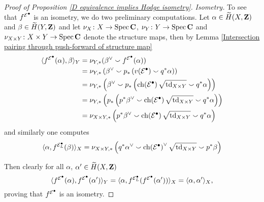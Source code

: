 \begin{proof}[Proof of Proposition \ref{D equivalence implies Hodge isometry}]
    \vspace{0.5cm}
    \noindent
    \textsl{Isometry.}
    To see that $f^{\mathcal E^\bullet}$ is an isometry, we do two preliminary computations. Let $\alpha \in \widetilde{H}(X, \mathbf Z)$ and $\beta \in \widetilde{H}(Y, \mathbf Z)$ and let $\nu_X \colon X \to \operatorname{Spec}\mathbf C$, $\nu_Y \colon Y \to \operatorname{Spec}\mathbf C$ and $\nu_{X \times Y} \colon X \times Y \to \operatorname{Spec}\mathbf C$ denote the structure maps, then by Lemma \ref{Intersection pairing through push-forward of structure map}
    \begin{align*}
        \pairing{\fmcoh{\E^\bullet}(\alpha)}{\beta}_Y &= \nu_{Y, *}(\beta^\vee \smallsmile \fmcoh{\E^\bullet}(\alpha))
        \\
        &= \nu_{Y, *}\left(
            \beta^\vee \smallsmile p_*\left(v(\E^\bullet) \smallsmile q^*\alpha\right)\right) 
        \\
        &= \nu_{Y, *}\left(
            \beta^\vee \smallsmile p_*\left(\ch{\E^\bullet}
            {\sqrt{\tdclass{X \times Y}}}
            \smallsmile q^*\alpha\right)
        \right) 
        \\
        &= \nu_{Y, *}\left( 
            p_*\left(
                p^*\beta^\vee \smallsmile \ch{\E^\bullet}
                {\sqrt{\tdclass{X \times Y}}}
                \smallsmile q^*\alpha
            \right)
        \right) \\
        &= \nu_{X \times Y, *}\left(
            p^*\beta^\vee \smallsmile \ch{\E^\bullet}
                {\sqrt{\tdclass{X \times Y}}}
                \smallsmile q^*\alpha
        \right)
    \end{align*}
    and similarly one computes
    \[
        \pairing{\alpha}{\fmcoh{\E^\bullet_L}(\beta)}_X = \nu_{X \times Y, *}\left(
            q^*\alpha^\vee \smallsmile \ch{\E^\bullet}^\vee
                {\sqrt{\tdclass{X \times Y}}}
                \smallsmile p^*\beta
        \right)
    \]

    Then clearly for all $\alpha$, $\alpha' \in \widetilde{H}(X, \mathbf Z)$
    \[
        \langle f^{\mathcal E^\bullet}(\alpha), f^{\mathcal E^\bullet}(\alpha') \rangle_Y = 
        \langle \alpha, f^{\mathcal E^\bullet_L}(f^{\mathcal E^\bullet}(\alpha')) \rangle_X = 
        \langle \alpha, \alpha' \rangle_X,
    \]       
    proving that $f^{\mathcal E^\bullet}$ is an isometry. 

    \vspace{0.5cm}


\end{proof}
